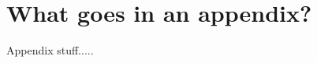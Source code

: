 \documentclass[./dissertation.tex]{subfiles}
\begin{document}
  \chapter{What goes in an appendix?}


    Appendix stuff.....
\end{document}
